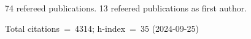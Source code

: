 74 refereed publications. 13 refeered publications as first author.

Total citations~=~4314; h-index~=~35 (2024-09-25)